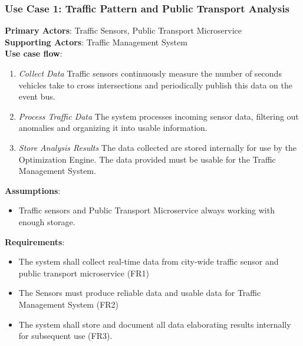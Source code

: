 \documentclass[a4paper,12pt]{article}
\begin{document}
\subsubsection*{Use Case 1: Traffic Pattern and Public Transport Analysis}
\textbf{Primary Actors}: Traffic Sensors, Public Transport Microservice \\
\textbf{Supporting Actors}: Traffic Management System \\ 
\textbf{Use case flow}: 
\begin{enumerate}
    \item \textit{Collect Data} Traffic sensors continuously measure the number of seconds vehicles take to cross intersections and periodically publish this data on the event bus.
    \item \textit{Process Traffic Data} The system processes incoming sensor data, filtering out anomalies and organizing it into usable information.
    \item \textit{Store Analysis Results} The data collected are stored internally for use by the Optimization Engine. The data provided must be usable for the Traffic Management System.
\end{enumerate}
\textbf{Assumptions}: 
\begin{itemize}
    \item Traffic sensors and Public Transport Microservice always working with enough storage.
\end{itemize}
\textbf{Requirements}: 
\begin{itemize}
    \item The system shall collect real-time data from city-wide traffic sensor and public transport microservice (FR1)
    \item The Sensors must produce reliable data and usable data for Traffic Management System (FR2)
    \item The system shall store and document all data elaborating results internally for subsequent use (FR3).
\end{itemize}
\end{document}
